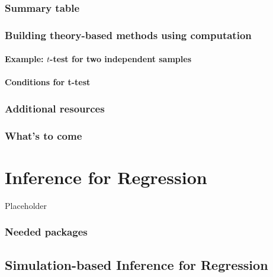 \documentclass[12pt, krantz2,]{krantz}
\begin{document}
\hypertarget{ht-conclusion-table}{%
\subsection{Summary table}\label{ht-conclusion-table}}

\hypertarget{theory-hypo}{%
\subsection{Building theory-based methods using computation}\label{theory-hypo}}

\hypertarget{example-t-test-for-two-independent-samples}{%
\subsubsection*{\texorpdfstring{Example: \(t\)-test for two independent samples}{Example: t-test for two independent samples}}\label{example-t-test-for-two-independent-samples}}


\hypertarget{conditions-for-t-test}{%
\subsubsection*{Conditions for t-test}\label{conditions-for-t-test}}


\hypertarget{additional-resources-7}{%
\subsection{Additional resources}\label{additional-resources-7}}

\hypertarget{whats-to-come-8}{%
\subsection{What's to come}\label{whats-to-come-8}}

\hypertarget{inference-for-regression}{%
\chapter{Inference for Regression}\label{inference-for-regression}}

Placeholder

\hypertarget{needed-packages-8}{%
\subsection*{Needed packages}\label{needed-packages-8}}


\hypertarget{simulation-based-inference-for-regression}{%
\section{Simulation-based Inference for Regression}\label{simulation-based-inference-for-regression}}
\end{document}
